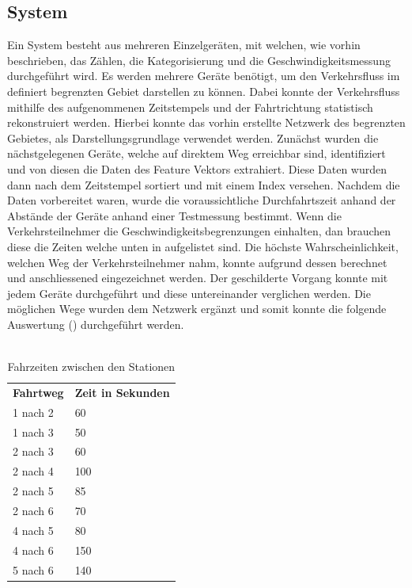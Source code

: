 \subsection{System}
Ein System besteht aus mehreren Einzelgeräten, mit welchen, wie vorhin beschrieben, das Zählen, die Kategorisierung und die Geschwindigkeitsmessung durchgeführt wird. Es werden mehrere Geräte benötigt, um den Verkehrsfluss im definiert begrenzten Gebiet darstellen zu können. Dabei konnte der Verkehrsfluss mithilfe des aufgenommenen Zeitstempels und der Fahrtrichtung statistisch rekonstruiert werden. Hierbei konnte das vorhin erstellte Netzwerk des begrenzten Gebietes, als Darstellungsgrundlage verwendet werden. Zunächst wurden die nächstgelegenen Geräte, welche auf direktem Weg erreichbar sind, identifiziert und von diesen die Daten des Feature Vektors extrahiert. Diese Daten wurden dann nach dem Zeitstempel sortiert und mit einem Index versehen. Nachdem die Daten vorbereitet waren, wurde die voraussichtliche Durchfahrtszeit anhand der Abstände der Geräte anhand einer Testmessung bestimmt. Wenn die Verkehrsteilnehmer die Geschwindigkeitsbegrenzungen einhalten, dan brauchen diese die Zeiten welche unten in   aufgelistet sind. Die höchste Wahrscheinlichkeit, welchen Weg der Verkehrsteilnehmer nahm, konnte aufgrund dessen berechnet und anschliessened eingezeichnet werden. Der geschilderte Vorgang konnte mit jedem Geräte durchgeführt und diese untereinander verglichen werden. Die möglichen Wege wurden dem Netzwerk ergänzt und somit konnte die folgende Auswertung () durchgeführt werden.\\\\

\begin{table}[H]
\centering
    \begin{tabular}{p{5cm}l}
    \textbf{Fahrtweg}                & \textbf{Zeit in Sekunden}   \\
    1 nach 2                           & 60  \\
    1 nach 3		                   & 50  \\
    2 nach 3	                       & 60  \\ 
    2 nach 4	                       & 100 \\
    2 nach 5                           & 85  \\
    2 nach 6                   		   & 70  \\
    4 nach 5                   		   & 80  \\
    4 nach 6                   		   & 150 \\
    5 nach 6                   		   & 140 \\   
\end{tabular}
\caption{Fahrzeiten zwischen den Stationen}
\label{tFahrzeiten}
\end{table}

